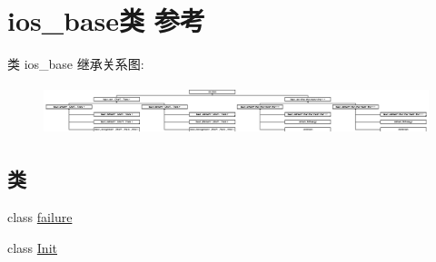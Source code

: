 \hypertarget{classios__base}{}\section{ios\+\_\+base类 参考}
\label{classios__base}
类 ios\+\_\+base 继承关系图\+:\begin{figure}[H]
\begin{center}
\leavevmode
\includegraphics[height=1.448276cm]{classios__base}
\end{center}
\end{figure}
\subsection*{类}
\begin{DoxyCompactItemize}
\item 
class \hyperlink{classios__base_1_1failure}{failure}
\item 
class \hyperlink{classios__base_1_1_init}{Init}
\end{DoxyCompactItemize}
